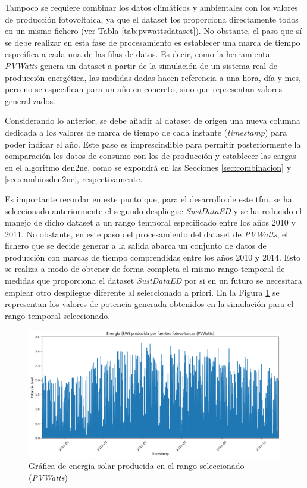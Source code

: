 Tampoco se requiere combinar los datos climáticos y ambientales con los valores de producción fotovoltaica, ya que el dataset los proporciona directamente todos en un mismo fichero (ver Tabla \ref{tab:pvwattsdataset}). No obstante, el paso que sí se debe realizar en esta fase de procesamiento es establecer una marca de tiempo específica a cada una de las filas de datos. Es decir, como la herramienta \textit{PVWatts} genera un dataset a partir de la simulación de un sistema real de producción energética, las medidas dadas hacen referencia a una hora, día y mes, pero no se especifican para un año en concreto, sino que representan valores generalizados. 

\vspace{3mm}

Considerando lo anterior, se debe añadir al dataset de origen una nueva columna dedicada a los valores de marca de tiempo de cada instante (\textit{timestamp}) para poder indicar el año. Este paso es imprescindible para permitir posteriormente la comparación los datos de consumo con los de producción y establecer las cargas en el algoritmo \gls{den2ne}, como se expondrá en las Secciones \ref{sec:combinacion} y \ref{sec:cambiosden2ne}, respectivamente. 

\vspace{3mm}

Es importante recordar en este punto que, para el desarrollo de este \gls{tfm}, se ha seleccionado anteriormente el segundo despliegue \textit{SustDataED} y se ha reducido el manejo de dicho dataset a un rango temporal especificado entre los años 2010 y 2011. No obstante, en este paso del procesamiento del dataset de \textit{PVWatts}, el fichero que se decide generar a la salida abarca un conjunto de datos de producción con marcas de tiempo comprendidas entre los años 2010 y 2014. Esto se realiza a modo de obtener de forma completa el mismo rango temporal de medidas que proporciona el dataset \textit{SustDataED} por si en un futuro se necesitara emplear otro despliegue diferente al seleccionado a priori. En la Figura \ref{fig:solaryearpv} se representan los valores de potencia generada obtenidos en la simulación para el rango temporal seleccionado.

\vspace{3mm}

\begin{figure}[H]
  \centering
  \includegraphics[width=1\textwidth]{img/diseno/matplotsolaryearpvwatts.png}
  \caption{Gráfica de energía solar producida en el rango seleccionado (\textit{PVWatts})}
  \label{fig:solaryearpv}
\end{figure}

